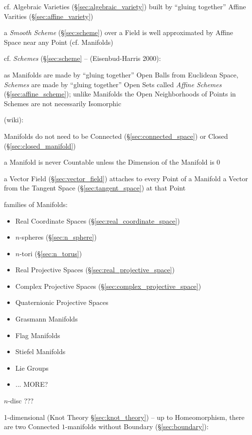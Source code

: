 cf. Algebraic Varieties (\S\ref{sec:algebraic_variety}) built by ``gluing
together'' Affine Varities (\S\ref{sec:affine_variety})

\fist a \emph{Smooth Scheme} (\S\ref{sec:scheme}) over a Field is well
approximated by Affine Space near any Point (cf. Manifolds)

\fist cf. \emph{Schemes} (\S\ref{sec:scheme} -- (Eisenbud-Harris 2000):

as Manifolds are made by ``gluing together'' Open Balls from Euclidean Space,
\emph{Schemes} are made by ``gluing together'' Open Sets called \emph{Affine
  Schemes} (\S\ref{sec:affine_scheme}); unlike Manifolds the Open Neighborhoods
of Points in Schemes are not necessarily Isomorphic

(wiki):

Manifolds do not need to be Connected (\S\ref{sec:connected_space}) or Closed
(\S\ref{sec:closed_manifold})

a Manifold is never Countable unless the Dimension of the Manifold is $0$

a Vector Field (\S\ref{sec:vector_field}) attaches to every Point of a Manifold
a Vector from the Tangent Space (\S\ref{sec:tangent_space}) at that Point

families of Manifolds:
\begin{itemize}
  \item Real Coordinate Spaces (\S\ref{sec:real_coordinate_space})
  \item $n$-spheres (\S\ref{sec:n_sphere})
  \item $n$-tori (\S\ref{sec:n_torus})
  \item Real Projective Spaces (\S\ref{sec:real_projective_space})
  \item Complex Projective Spaces (\S\ref{sec:complex_projective_space})
  \item Quaternionic Projective Spaces
  \item Grasmann Manifolds
  \item Flag Manifolds
  \item Stiefel Manifolds
  \item Lie Groups
  \item ... MORE?
\end{itemize}

$n$-disc ??? %

1-dimensional (Knot Theory \S\ref{sec:knot_theory}) -- up to Homeomorphism,
there are two Connected $1$-manifolds without Boundary (\S\ref{sec:boundary}):

